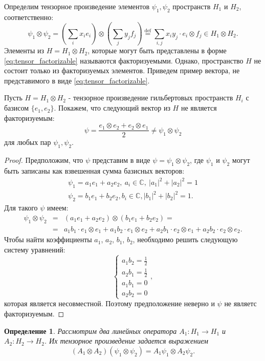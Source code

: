 \documentclass[%
master,         %
subf,           %
href,           %
colorlinks=true %
]{disser}
\numberwithin{equation}{section}
\numberwithin{figure}{section}
\newtheorem{definition}{Определение}[section]
\begin{document}
Определим тензорное произведение элементов $\psi_1, \psi_2$ пространств $H_1$ и $H_2$, соответственно:
\begin{equation}
\psi_1 \otimes \psi_2 = \left(\sum_ix_ie_i\right) \otimes \left(\sum_jy_jf_j\right) \overset{\mbox{def}}= \sum_{i, j} x_iy_j \cdot e_i \otimes f_j \in H_1 \otimes H_2.
\label{eq:tensor_factorizable}
\end{equation}
Элементы из $H = H_1\otimes H_2$, которые могут быть представлены в форме \eqref{eq:tensor_factorizable} называются факторизуемыми. Однако, пространство $H$ не состоит только из факторизуемых элементов. Приведем пример вектора, не представимого в виде \eqref{eq:tensor_factorizable}.

Пусть $H = H_1\otimes H_2$ - тензорное произведение гильбертовых пространств $H_i$ с базисом $\{e_1, e_2\}$. Покажем, что следующий вектор из $H$ не является факторизуемым: 
\[
	\psi = \frac{e_1 \otimes e_2 + e_2 \otimes e_1}{2} \ne \psi_1 \otimes \psi_2
\]
для любых пар $\psi_1, \psi_2$.
\begin{proof}
Предположим, что $\psi$ представим в виде $\psi = \psi_1\otimes\psi_2$, где 
$\psi_1$ и $\psi_2$ могут быть записаны как взвешенная сумма базисных векторов:
\begin{gather*}
	\psi_1 = a_1 e_1 + a_2 e_2,\ a_i\in \mathbb{C},\ |a_1|^2 + |a_2|^2 = 1 \\
	\psi_2 = b_1 e_1 + b_2 e_2, b_i\in \mathbb{C}, |b_1|^2 + |b_2|^2 = 1.
\end{gather*}
Для такого $\psi$ имеем:
\begin{eqnarray*}
	\psi_1 \otimes \psi_2 &=& (a_1 e_1 + a_2 e_2) \otimes (b_1 e_1 + b_2 e_2) = \\ &=&  
	a_1 b_1 \cdot e_1 \otimes e_1 + a_1 b_2 \cdot e_1 \otimes e_2 + 
	a_2 b_1 \cdot e_2 \otimes e_1 + a_2 b_2 \cdot e_2 \otimes e_2.
\end{eqnarray*}
Чтобы найти коэффициенты $a_1$, $a_2$, $b_1$, $b_2$, необходимо решить следующую систему уравнений:
$$
\begin{cases}
a_1 b_2 = \frac12 \\
a_2 b_1 = \frac12 \\
a_1 b_1 = 0 \\
a_2 b_2 = 0
\end{cases},
$$
которая является несовместной. Поэтому предположение неверно и $\psi$ не являетс факторизуемым.
\end{proof}
 
\begin{definition}
Рассмотрим два линейных оператора $A_1: H_1\to H_1$ и $A_2: H_2\to H_2$. Их тензорное произведение задается выражением
\[
(A_1\otimes A_2)(\psi_1\otimes \psi_2) = A_1\psi_1 \otimes A_2\psi_2.
\]
\end{definition}
\end{document}
